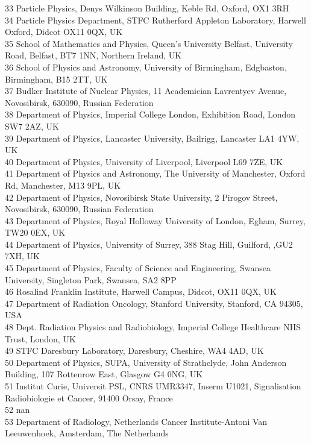 {\begin{tabbing}
     33 \> Particle Physics, Denys Wilkinson Building, Keble Rd, Oxford, OX1 3RH\\
     34 \> Particle Physics Department, STFC Rutherford Appleton Laboratory, Harwell Oxford, Didcot OX11 0QX, UK\\
     35 \> School of Mathematics and Physics, Queen's University Belfast, University Road, Belfast, BT7 1NN, Northern Ireland, UK\\
     36 \> School of Physics and Astronomy, University of Birmingham, Edgbaston, Birmingham, B15 2TT, UK\\
     37 \> Budker Institute of Nuclear Physics, 11 Academician Lavrentyev Avenue, Novosibirsk, 630090, Russian Federation\\
     38 \> Department of Physics, Imperial College London, Exhibition Road, London SW7 2AZ, UK\\
     39 \> Department of Physics, Lancaster University, Bailrigg, Lancaster LA1 4YW, UK\\
     40 \> Department of Physics, University of Liverpool, Liverpool L69 7ZE, UK\\
     41 \> Department of Physics and Astronomy, The University of Manchester, Oxford Rd, Manchester, M13 9PL, UK\\
     42 \> Department of Physics, Novosibirsk State University, 2 Pirogov Street, Novosibirsk, 630090, Russian Federation\\
     43 \> Department of Physics, Royal Holloway University of London, Egham, Surrey, TW20 0EX, UK\\
     44 \> Department of Physics, University of Surrey, 388 Stag Hill, Guilford, ,GU2 7XH, UK\\
     45 \> Department of Physics, Faculty of Science and Engineering, Swansea University, Singleton Park, Swansea, SA2 8PP\\
     46 \> Rosalind Franklin Institute, Harwell Campus, Didcot, OX11 0QX, UK\\
     47 \> Department of Radiation Oncology, Stanford University, Stanford, CA 94305, USA\\
     48 \> Dept. Radiation Physics and Radiobiology, Imperial College Healthcare NHS Trust, London, UK\\
     49 \> STFC Daresbury Laboratory, Daresbury, Cheshire, WA4 4AD, UK\\
     50 \> Department of Physics, SUPA, University of Strathclyde, John Anderson Building, 107 Rottenrow East, Glasgow G4 0NG, UK\\
     51 \> Institut Curie, Universit PSL, CNRS UMR3347, Inserm U1021, Signalisation Radiobiologie et Cancer, 91400 Orsay, France\\
     52 \> nan\\
     53 \> Department of Radiology, Netherlands Cancer Institute-Antoni Van Leeuwenhoek, Amsterdam, The Netherlands\\
    ~   \> \\
  \end{tabbing}
}

